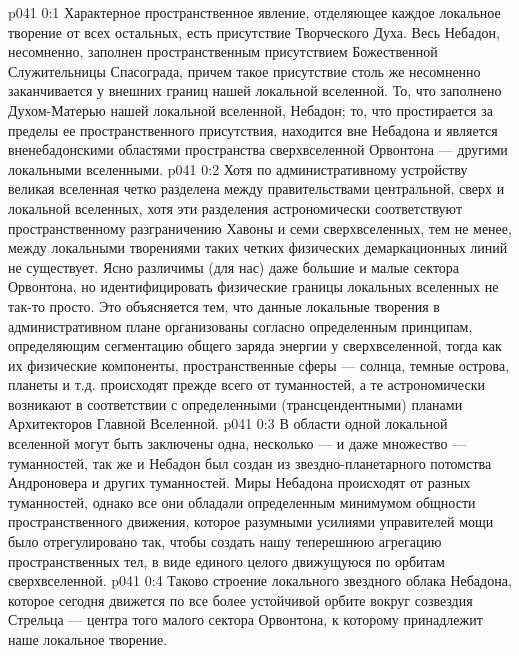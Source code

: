 \author{Архангел}
\vs p041 0:1 Характерное пространственное явление, отделяющее каждое локальное творение от всех остальных, есть присутствие Творческого Духа. Весь Небадон, несомненно, заполнен пространственным присутствием Божественной Служительницы Спасограда, причем такое присутствие столь же несомненно заканчивается у внешних границ нашей локальной вселенной. То, что заполнено Духом\hyp{}Матерью нашей локальной вселенной,  Небадон; то, что простирается за пределы ее пространственного присутствия, находится вне Небадона и является вненебадонскими областями пространства сверхвселенной Орвонтона --- другими локальными вселенными.
\vs p041 0:2 \pc Хотя по административному устройству великая вселенная четко разделена между правительствами центральной, сверх и локальной вселенных, хотя эти разделения астрономически соответствуют пространственному разграничению Хавоны и семи сверхвселенных, тем не менее, между локальными творениями таких четких физических демаркационных линий не существует. Ясно различимы (для нас) даже большие и малые сектора Орвонтона, но идентифицировать физические границы локальных вселенных не так\hyp{}то просто. Это объясняется тем, что данные локальные творения в административном плане организованы согласно определенным  принципам, определяющим сегментацию общего заряда энергии у сверхвселенной, тогда как их физические компоненты, пространственные сферы --- солнца, темные острова, планеты и т.д. происходят прежде всего от туманностей, а те астрономически возникают в соответствии с определенными  (трансцендентными) планами Архитекторов Главной Вселенной.
\vs p041 0:3 В области одной локальной вселенной могут быть заключены одна, несколько --- и даже множество --- туманностей, так же и Небадон был создан из звездно\hyp{}планетарного потомства Андроновера и других туманностей. Миры Небадона происходят от разных туманностей, однако все они обладали определенным минимумом общности пространственного движения, которое разумными усилиями управителей мощи было отрегулировано так, чтобы создать нашу теперешнюю агрегацию пространственных тел, в виде единого целого движущуюся по орбитам сверхвселенной.
\vs p041 0:4 Таково строение локального звездного облака Небадона, которое сегодня движется по все более устойчивой орбите вокруг созвездия Стрельца --- центра того малого сектора Орвонтона, к которому принадлежит наше локальное творение.
